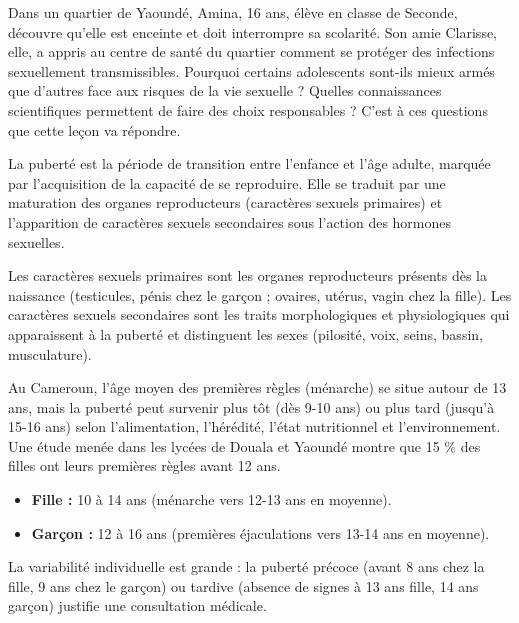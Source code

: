 \documentclass[11pt]{article}
\newcommand{\cle}[1]{{\popxbold\color{popdark}#1}}
\newcounter{popsec}
\newcounter{popsub}
\newcommand{\courssub}[1]{%
  \stepcounter{popsub}%
  \par\vspace{9pt}\noindent{\popxbold\fontsize{11.5}{13}\selectfont\color{popink}{\color{poporange}\thepopsec.\thepopsub}\hspace{6pt}#1}\par\nopagebreak\vspace{4pt}
}
\begin{document}
Dans un quartier de Yaoundé, Amina, 16 ans, élève en classe de Seconde, découvre qu'elle est enceinte et doit interrompre sa scolarité. Son amie Clarisse, elle, a appris au centre de santé du quartier comment se protéger des infections sexuellement transmissibles. Pourquoi certains adolescents sont-ils mieux armés que d'autres face aux risques de la vie sexuelle ? Quelles connaissances scientifiques permettent de faire des choix responsables ? C'est à ces questions que cette leçon va répondre.

\courssub{La puberté : une transition majeure}

\begin{definition}[Puberté]
La \cle{puberté} est la période de transition entre l'enfance et l'âge adulte, marquée par l'acquisition de la capacité de se reproduire. Elle se traduit par une maturation des organes reproducteurs (caractères sexuels primaires) et l'apparition de caractères sexuels secondaires sous l'action des hormones sexuelles.
\end{definition}

\begin{definition}
Les \cle{caractères sexuels primaires} sont les organes reproducteurs présents dès la naissance (testicules, pénis chez le garçon ; ovaires, utérus, vagin chez la fille). Les \cle{caractères sexuels secondaires} sont les traits morphologiques et physiologiques qui apparaissent à la puberté et distinguent les sexes (pilosité, voix, seins, bassin, musculature).
\end{definition}

\begin{savaistu}
Au Cameroun, l'âge moyen des premières règles (ménarche) se situe autour de 13 ans, mais la puberté peut survenir plus tôt (dès 9-10 ans) ou plus tard (jusqu'à 15-16 ans) selon l'alimentation, l'hérédité, l'état nutritionnel et l'environnement. Une étude menée dans les lycées de Douala et Yaoundé montre que 15 \% des filles ont leurs premières règles avant 12 ans.
\end{savaistu}

\begin{propriete}
\begin{itemize}
    \item \textbf{Fille :} 10 à 14 ans (ménarche vers 12-13 ans en moyenne).
    \item \textbf{Garçon :} 12 à 16 ans (premières éjaculations vers 13-14 ans en moyenne).
\end{itemize}
La variabilité individuelle est grande : la puberté précoce (avant 8 ans chez la fille, 9 ans chez le garçon) ou tardive (absence de signes à 13 ans fille, 14 ans garçon) justifie une consultation médicale.
\end{propriete}
\end{document}
